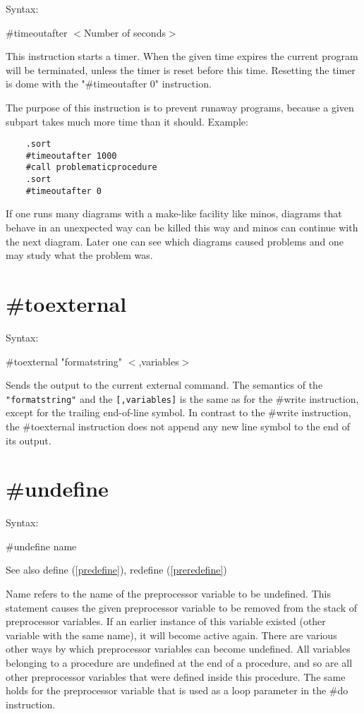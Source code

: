 \noindent Syntax:

\#timeoutafter $<$Number of seconds$>$
 
\noindent This instruction starts a timer. When the given time expires the 
current program will be terminated, unless the timer is reset before this 
time. Resetting the timer is dome with the "\#timeoutafter 0" instruction.

The purpose of this instruction is to prevent runaway programs, because a 
given subpart takes much more time than it should. Example:
\begin{verbatim}
    .sort
	#timeoutafter 1000
	#call problematicprocedure
	.sort
	#timeoutafter 0
\end{verbatim}
If one runs many diagrams with a make-like facility like minos, diagrams 
that behave in an unexpected way can be killed this way and minos can 
continue with the next diagram. Later one can see which diagrams caused 
problems and one may study what the problem was.


\section{\#toexternal}
\label{pretoexternal}

\noindent Syntax:

\#toexternal "formatstring" $<$,variables$>$

\noindent Sends the output to the current external 
command. The semantics of the \verb|"formatstring"| and the
\verb|[,variables]| is the same as for the \#write 
instruction, except for the trailing end-of-line symbol. In contrast to the 
\#write instruction, the \#toexternal instruction does not append any new 
line symbol to the end of its output.


\section{\#undefine}
\label{preundefine}

\noindent Syntax:

\#undefine name
 
\noindent See also define (\ref{predefine}), redefine 
(\ref{preredefine})

\noindent {} Name refers to the name of the 
preprocessor variable to be undefined. This 
statement causes the given preprocessor variable to be removed from the 
stack of preprocessor variables. If an earlier instance of this variable 
existed (other variable with the same name), it will become active again. 
There are various other ways by which preprocessor variables can become 
undefined. All variables belonging to a procedure are undefined at the end 
of a procedure, and so are all other preprocessor variables that were 
defined inside this procedure. The same holds for the preprocessor variable 
that is used as a loop parameter in the \#do instruction.

